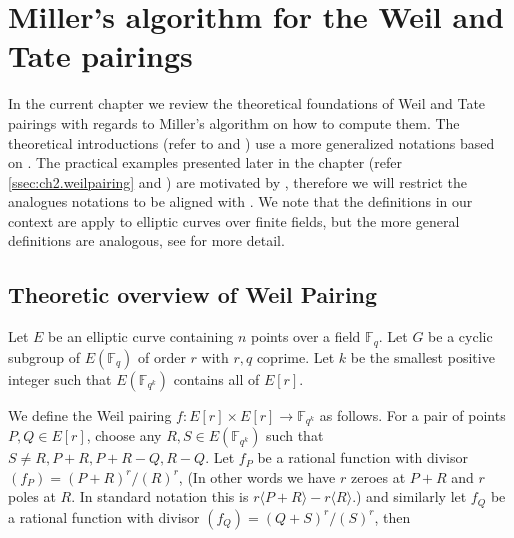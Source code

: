 \section{Miller's algorithm for the Weil and Tate pairings}
\label{sec:ch2.weilandtatepairings}

In the current chapter we review the theoretical foundations of Weil and Tate  pairings with regards to Miller's algorithm on how to compute them. The theoretical introductions (refer to  and ) use a more generalized notations based on \cite{lynn2007implementation}. The practical examples presented later in the chapter (refer \ref{ssec:ch2.weilpairing} and ) are motivated by \cite{theory.pairings.for.beginners}, therefore we will restrict the analogues notations to be aligned with \cite{theory.pairings.for.beginners}.  We note that the definitions in our context are apply to elliptic curves over finite fields, but the more general definitions are analogous, see \cite{Sil09, Gal05} for more detail.

\subsection{Theoretic overview of Weil Pairing}
\label{secs:ch2.theoreticweil}

Let $E$ be an elliptic curve containing $n$ points over a field $\mathbb{F}_q$. Let $G$ be a cyclic subgroup of $E(\mathbb{F}_q)$ of order $r$ with $r, q$ coprime. Let $k$ be the smallest positive integer such that $E(\mathbb{F}_{q^k})$ contains all of $E[r]$. 

We define the Weil pairing $f : E[r] \times E[r] \to \mathbb{F}_{q^k}$ as follows. For a pair of points $P, Q \in E[r]$, choose any $R, S \in E(\mathbb{F}_{q^k})$ such that $S \neq R, P+R, P+R-Q, R-Q$. Let $f_P$ be a rational function with divisor $(f_P) = (P+R)^r/(R)^r$, (In other words we have $r$ zeroes at $P+R$ and $r$ poles at $R$.  In standard notation this is $r\langle P+R \rangle - r\langle R \rangle$.) and similarly let $f_Q$ be a rational function with divisor $(f_Q) = (Q+S)^r/(S)^r$, then



